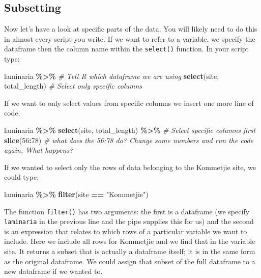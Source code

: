 \documentclass[
]{book}
\newenvironment{Shaded}{\begin{snugshade}}{\end{snugshade}}
\newcommand{\CommentTok}[1]{\textcolor[rgb]{0.56,0.35,0.01}{\textit{#1}}}
\newcommand{\DecValTok}[1]{\textcolor[rgb]{0.00,0.00,0.81}{#1}}
\newcommand{\KeywordTok}[1]{\textcolor[rgb]{0.13,0.29,0.53}{\textbf{#1}}}
\newcommand{\NormalTok}[1]{#1}
\newcommand{\OperatorTok}[1]{\textcolor[rgb]{0.81,0.36,0.00}{\textbf{#1}}}
\newcommand{\StringTok}[1]{\textcolor[rgb]{0.31,0.60,0.02}{#1}}
\begin{document}
\hypertarget{subsetting}{%
\subsection{Subsetting}\label{subsetting}}

Now let's have a look at specific parts of the data. You will likely need to do this in almost every script you write. If we want to refer to a variable, we specify the dataframe then the column name within the \texttt{select()} function. In your script type:

\begin{Shaded}
\begin{Highlighting}[]
\NormalTok{laminaria }\OperatorTok{\%>\%}\StringTok{ }\CommentTok{\# Tell R which dataframe we are using}
\StringTok{  }\KeywordTok{select}\NormalTok{(site, total\_length) }\CommentTok{\# Select only specific columns}
\end{Highlighting}
\end{Shaded}

If we want to only select values from specific columns we insert one more line of code.

\begin{Shaded}
\begin{Highlighting}[]
\NormalTok{laminaria }\OperatorTok{\%>\%}\StringTok{ }
\StringTok{  }\KeywordTok{select}\NormalTok{(site, total\_length) }\OperatorTok{\%>\%}\StringTok{ }\CommentTok{\# Select specific columns first}
\StringTok{  }\KeywordTok{slice}\NormalTok{(}\DecValTok{56}\OperatorTok{:}\DecValTok{78}\NormalTok{)}
\CommentTok{\# what does the \textquotesingle{}56:78\textquotesingle{} do? Change some numbers and run the code again. What happens?}
\end{Highlighting}
\end{Shaded}

If we wanted to select only the rows of data belonging to the Kommetjie site, we could type:

\begin{Shaded}
\begin{Highlighting}[]
\NormalTok{laminaria }\OperatorTok{\%>\%}
\StringTok{  }\KeywordTok{filter}\NormalTok{(site }\OperatorTok{==}\StringTok{ "Kommetjie"}\NormalTok{)}
\end{Highlighting}
\end{Shaded}

The function \texttt{filter()} has two arguments: the first is a dataframe (we specify \texttt{laminaria} in the previous line and the pipe supplies this for us) and the second is an expression that relates to which rows of a particular variable we want to include. Here we include all rows for Kommetjie and we find that in the variable site. It returns a subset that is actually a dataframe itself; it is in the same form as the original dataframe. We could assign that subset of the full dataframe to a new dataframe if we wanted to.
\end{document}
